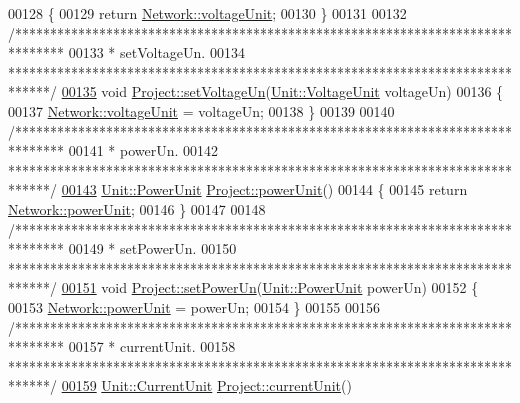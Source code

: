 \begin{DoxyCode}
00128 \{
00129   \textcolor{keywordflow}{return} \hyperlink{group___graphics_gacde031ef95f5c05565ee35769f2ed89e}{Network::voltageUnit};
00130 \}
00131 
00132 \textcolor{comment}{/*******************************************************************************}
00133 \textcolor{comment}{ * setVoltageUn.}
00134 \textcolor{comment}{ ******************************************************************************/}
\hypertarget{project_8cpp_source_l00135}{}\hyperlink{class_project_aa26b488b2e93c8a8c6b4423ce07df4a1}{00135} \textcolor{keywordtype}{void} \hyperlink{class_project_aa26b488b2e93c8a8c6b4423ce07df4a1}{Project::setVoltageUn}(\hyperlink{class_unit_a55b07dfa9457e1eca2c7194fe0cfc3c1}{Unit::VoltageUnit} voltageUn)
00136 \{
00137   \hyperlink{group___graphics_gacde031ef95f5c05565ee35769f2ed89e}{Network::voltageUnit} = voltageUn;
00138 \}
00139 
00140 \textcolor{comment}{/*******************************************************************************}
00141 \textcolor{comment}{ * powerUn.}
00142 \textcolor{comment}{ ******************************************************************************/}
\hypertarget{project_8cpp_source_l00143}{}\hyperlink{class_project_a2a1bc35358d6189695d6e5b7dd547ffd}{00143} \hyperlink{class_unit_ace265ae255370ccacfd5370337572c3b}{Unit::PowerUnit} \hyperlink{class_project_a2a1bc35358d6189695d6e5b7dd547ffd}{Project::powerUnit}()
00144 \{
00145   \textcolor{keywordflow}{return} \hyperlink{group___graphics_ga9504015bc566f4a3d3b4d4a86000293b}{Network::powerUnit};
00146 \}
00147 
00148 \textcolor{comment}{/*******************************************************************************}
00149 \textcolor{comment}{ * setPowerUn.}
00150 \textcolor{comment}{ ******************************************************************************/}
\hypertarget{project_8cpp_source_l00151}{}\hyperlink{class_project_aa46b8645d2047c1a2e8d329b9ebbc120}{00151} \textcolor{keywordtype}{void} \hyperlink{class_project_aa46b8645d2047c1a2e8d329b9ebbc120}{Project::setPowerUn}(\hyperlink{class_unit_ace265ae255370ccacfd5370337572c3b}{Unit::PowerUnit} powerUn)
00152 \{
00153   \hyperlink{group___graphics_ga9504015bc566f4a3d3b4d4a86000293b}{Network::powerUnit} = powerUn;
00154 \}
00155 
00156 \textcolor{comment}{/*******************************************************************************}
00157 \textcolor{comment}{ * currentUnit.}
00158 \textcolor{comment}{ ******************************************************************************/}
\hypertarget{project_8cpp_source_l00159}{}\hyperlink{class_project_a0d22341fcc068be743b776df0a02f55e}{00159} \hyperlink{class_unit_a0794cf6c9682f48296dd4a5315389787}{Unit::CurrentUnit} \hyperlink{class_project_a0d22341fcc068be743b776df0a02f55e}{Project::currentUnit}()

\end{DoxyCode}
